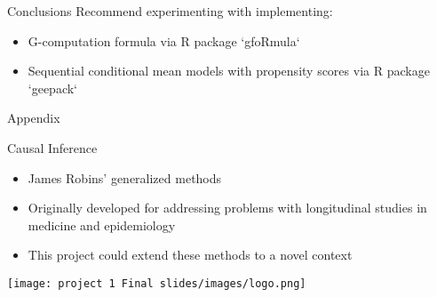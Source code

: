 \documentclass[
]{beamer}
\begin{document}


\begin{frame}{Conclusions}
Recommend experimenting with implementing:
\begin{itemize}
    \item G-computation formula via R package `gfoRmula`
    \item Sequential conditional mean models with propensity scores via R package `geepack`
\end{itemize}
\end{frame}


\begin{frame}{Appendix}
\end{frame}


\begin{frame}{Causal Inference}
\begin{itemize}
    \item James Robins' generalized methods 
    \item Originally developed for addressing problems with longitudinal studies in medicine and epidemiology 
    \item This project could extend these methods to a novel context 
\end{itemize}
\centering
\texttt{[image: project 1 Final slides/images/logo.png]}
\end{frame}

\end{document}
